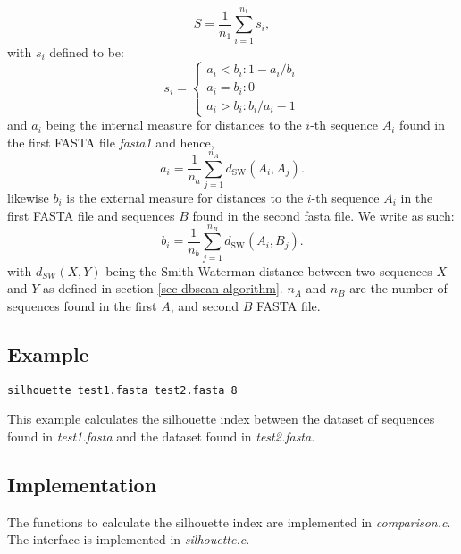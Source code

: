 \begin{equation}
  S=\frac{1}{n_1}\sum_{i=1}^{n_{1}} s_{i},
\end{equation}
with $s_i$ defined to be:
\begin{equation}
  s_i=\left\{
  \begin{array}{l}
    a_i < b_i : 1-a_i/b_i \\
    a_i = b_i : 0 \\
    a_i > b_i : b_i/a_i-1
  \end{array} \right.
\end{equation}
and $a_i$ being the internal measure for distances to the $i$-th
sequence $A_i$ found in the first FASTA file \emph{fasta1} and hence,
\begin{equation}
  a_i = \frac{1}{n_a}\sum_{j=1}^{n_A}d_{\mathrm{SW}}(A_i,A_j).
\end{equation}
likewise $b_i$ is the external measure for distances to the $i$-th
sequence $A_i$ in the first FASTA file and sequences $B$ found in the
second fasta file. We write as such:
\begin{equation}
  b_i = \frac{1}{n_b}\sum_{j=1}^{n_B}d_{\mathrm{SW}}(A_i,B_j).
\end{equation}
with $d_{SW}(X,Y)$ being the Smith Waterman distance between two
sequences $X$ and $Y$ as defined in section
\ref{sec-dbscan-algorithm}. $n_A$ and $n_B$ are the number of
sequences found in the first $A$, and second $B$ FASTA file. 

\subsection{Example}
\begin{lstlisting}
silhouette test1.fasta test2.fasta 8
\end{lstlisting}
This example calculates the silhouette index between the dataset of
sequences found  in \emph{test1.fasta} and the dataset found in
\emph{test2.fasta}.

\subsection{Implementation}
The functions to calculate the silhouette index are implemented in
\emph{comparison.c}. The interface is implemented in
\emph{silhouette.c}.


